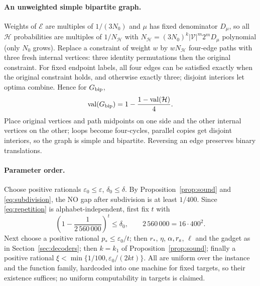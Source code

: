 \documentclass[11pt]{article}
\newcommand{\eps}{\varepsilon}
\newcommand{\val}{\operatorname{val}}
\begin{document}
\paragraph{An unweighted simple bipartite graph.} Weights of $\mathcal E$
are multiples of $1/(3N_0)$ and $\mu$ has fixed denominator $D_\mu$, so all
$\mathcal H$ probabilities are multiples of $1/N_{\mathcal H}$ with
$N_{\mathcal H}=(3N_0)^k|\mathcal V|^m2^mD_\mu$ polynomial (only $N_0$
grows). Replace a constraint of weight $w$ by $wN_{\mathcal H}$ four-edge
paths with three fresh internal vertices: three identity permutations then
the original constraint. For fixed endpoint labels, all four edges can be
satisfied exactly when the original constraint holds, and otherwise exactly
three; disjoint interiors let optima combine. Hence for $G_{\rm bip}$,
\begin{equation}\label{eq:subdivision}
 \val(G_{\rm bip})=1-\frac{1-\val(\mathcal H)}4.
\end{equation}
Place original vertices and path midpoints on one side and the other
internal vertices on the other; loops become four-cycles, parallel copies
get disjoint interiors, so the graph is simple and bipartite. Reversing an edge
preserves binary translations.

\paragraph{Parameter order.} Choose positive rationals $\eps_0\le\eps$,
$\delta_0\le\delta$. By Proposition~\ref{prop:sound} and
\eqref{eq:subdivision}, the NO gap after subdivision is at least $1/400$. Since
\eqref{eq:repetition} is alphabet-independent, first fix $t$ with
\begin{equation}\label{eq:final-t}
 \left(1-\frac1{2\,560\,000}\right)^t\le\delta_0,
 \qquad 2\,560\,000=16\cdot400^2.
\end{equation}
Next choose a positive rational $p_*\le\eps_0/t$; then $r_*$, $\eta$,
$\alpha,r_{\rm s}$, $\ell$ and the gadget as in Section~\ref{sec:decoders};
then $k=k_1$ of Proposition~\ref{prop:sound}; finally a positive rational
$\xi<\min\{1/100,\eps_0/(2kt)\}$. All are uniform over the instance and the function family,
hardcoded into one machine for fixed targets, so their existence suffices;
no uniform computability in targets is claimed.
\end{document}
